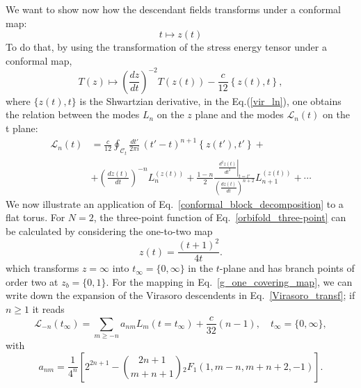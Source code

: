 \documentclass[a4paper,11pt]{article}
\begin{document}
We want to show now how the descendant fields transforms under a conformal map:
\begin{equation}
t \mapsto z(t)
\end{equation}
To do that, by using the transformation of the stress energy tensor under a conformal map,
\begin{equation}
T(z)\mapsto \left(\frac{d z}{d t}\right)^{-2} T(z(t))-\frac{c}{12}\left\{z(t),t\right\},
\end{equation}
where $\{z(t),t\}$ is the Shwartzian derivative,  in the Eq.(\ref{vir_ln}), one obtains the relation between the modes $L_{n}$ on the $z$ plane and the modes $\mathcal{L}_n(t)$ on the t plane:
\begin{equation}\label{gengen}
\begin{aligned}
 \mathcal{L}_{n}(t)&=\frac{c}{12} \oint_{\mathcal{C}_t}\frac{d t'}{2\pi i}\, (t'-t)^{n+1}\left\{z(t'),t'\right\} +\\
 & +\left(\frac{d z(t)}{d t}\right)^{-n} L_n^{(z(t))}
 +\frac{1-n}{2}\frac{\left.\frac{d^2 z(t)}{d t^2}\right|_{t=t'}}{\left(\frac{d z(t)}{d t}\right)^{n+2}}L_{n+1}^{(z(t))}+\cdots
 \end{aligned}
\end{equation}
We now illustrate an application of Eq.~\eqref{conformal_block_decomposition} to a flat torus. For $N=2$, the three-point function of Eq.~\eqref{orbifold_three-point} 
can be calculated by considering the  one-to-two map
\begin{equation}\label{g_one_covering_map}
 z(t)=\frac{(t+1)^2}{4t}.
\end{equation}
which transforms $z=\infty$ into $t_{\infty}=\{0,\infty\}$
in the $t$-plane and has branch points of order two at $z_b=\{0,1\}$.  For the mapping in Eq.~\eqref{g_one_covering_map}, 
we can write down  the expansion of the Virasoro descendents in Eq.~\eqref{Virasoro_transf};
if $n\geq 1$ it reads
\begin{equation}
\label{g1_1}
 \mathcal{L}_{-n}(t_{\infty})=\sum_{m\geq -n} a_{nm} L_{m}(t=t_{\infty})+\frac{c}{32}(n-1), \quad t_{\infty}=\{0,\infty\},
\end{equation}
with
\begin{equation}
\label{g1_2}
 a_{nm}=\frac{1}{4^n}\left[2^{2n+1}-\binom{2n+1}{m+n+1}{}_2F_1(1, m-n, m+n+2, -1)\right].
\end{equation}
\end{document}
